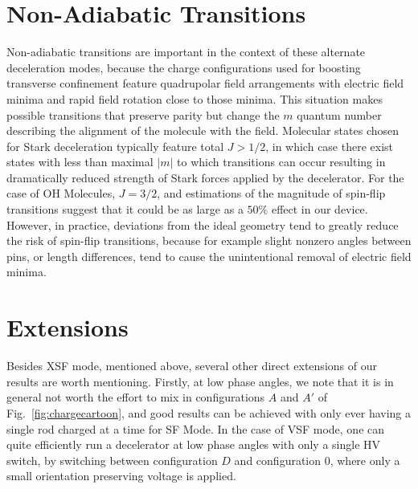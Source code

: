\documentclass[%
 reprint,
 amsmath,amssymb,
 aps,
prl,
]{revtex4-1}
\begin{document}

\section{Non-Adiabatic Transitions}
Non-adiabatic transitions are important in the context of these alternate deceleration modes, because the charge configurations used for boosting transverse confinement feature quadrupolar field arrangements with electric field minima and rapid field rotation close to those minima.
This situation makes possible transitions that preserve parity but change the $m$ quantum number describing the alignment of the molecule with the field.
Molecular states chosen for Stark deceleration typically feature total $J>1/2$, in which case there exist states with less than maximal $|m|$ to which transitions can occur resulting in dramatically reduced strength of Stark forces applied by the decelerator.
For the case of OH Molecules, $J=3/2$, and estimations of the magnitude of spin-flip transitions suggest that it could be as large as a $50\%$ effect in our device. 
However, in practice, deviations from the ideal geometry tend to greatly reduce the risk of spin-flip transitions, because for example slight nonzero angles between pins, or length differences, tend to cause the unintentional removal of electric field minima.

\section{Extensions}
Besides XSF mode, mentioned above, several other direct extensions of our results are worth mentioning. Firstly, at low phase angles, we note that it is in general not worth the effort to mix in configurations $A$ and $A'$ of Fig.~\ref{fig:chargecartoon}, and good results can be achieved with only ever having a single rod charged at a time for SF Mode. In the case of VSF mode, one can quite efficiently run a decelerator at low phase angles with only a single HV switch, by switching between configuration $D$ and configuration $0$, where only a small orientation preserving voltage is applied.
\end{document}

